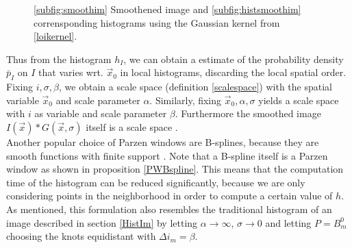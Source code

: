 \begin{figure}
  \centering
  \quad
  \caption{\ref{subfig:smoothim} Smoothened image and \ref{subfig:histsmoothim} corrensponding histograms using the Gaussian kernel from \eqref{loikernel}.}\label{fig:HistSmoothRandIm}
\end{figure}

Thus from the histogram $h_I$, we can obtain a estimate of the probability density $\bar{p}_I$ on $I$ that varies wrt. $\vec{x}_0$ in local histograms, discarding the local spatial order.\\
Fixing $i,\sigma,\beta$, we obtain a scale space (definition \ref{scalespace}) with the spatial variable $\vec{x}_0$ and scale parameter $\alpha$. Similarly, fixing $\vec{x}_0,\alpha,\sigma$ yields a scale space with $i$ as variable and scale parameter $\beta$. Furthermore the smoothed image $I(\vec{x})*G(\vec{x},\sigma)$ itself is a scale space \cite{dar.12}.\\

 Another popular choice of Parzen windows are B-splines, because they are smooth functions with finite support \cite{the.00}. Note that a B-spline itself is a Parzen window as shown in proposition \ref{PWBspline}. This means that the computation time of the histogram can be reduced significantly, because we are only considering points in the neighborhood in order to compute a certain value of $h$.\\
As mentioned, this formulation also resembles the traditional histogram of an image described in section \ref{HistIm} by letting $\alpha\to\infty$, $\sigma\to 0$ and letting $P=B_m^0$ choosing the knots equidistant with $\Delta i_m = \beta$.